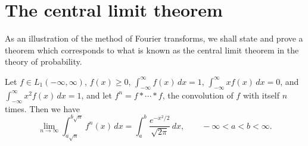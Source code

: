 \section{The central limit theorem}
\label{sec:I-10}

As an illustration of the method of Fourier transforms, we shall state and prove a theorem which corresponds to what is known as the central limit theorem in the theory of probability.

\begin{theorem}\label{thm:I-18}
Let $f\in L_1(-\infty,\infty)$, $f(x)\ge 0$, $\int_{-\infty}^{\infty}f(x)\,dx=1$, $\int_{-\infty}^{\infty}xf(x)\,dx=0$, and $\int_{-\infty}^{\infty}x^{2}f(x)\,dx=1$, and let $f^n=f*\cdots*f$, the convolution of $f$ with itself $n$ times. Then we have
\begin{equation}\label{eq:I-10.0}\tag{10.0}
\lim_{n\to\infty}\int_{a\sqrt n}^{b\sqrt n}f^n(x)\,dx
=\int_{a}^{b}\frac{e^{-x^{2}/2}}{\sqrt{2\pi}}\,dx,\qquad -\infty<a<b<\infty.
\end{equation}
\end{theorem}

